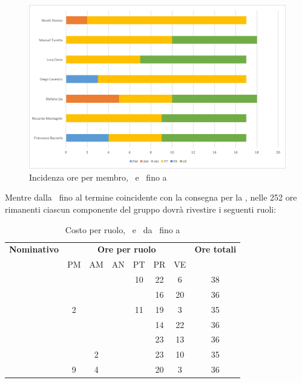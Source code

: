 \begin{figure}[H]
	\centering 
	\includegraphics[scale=0.7]{Immagini/GraficiPianoLavoro/PD.png}
	\caption{Incidenza ore per membro, \PD\ e \COD\ fino a \RP}
\end{figure}

\newpage
Mentre dalla \RP\ fino al termine coincidente con la consegna per la \RQ, nelle 252 ore rimanenti ciascun componente del gruppo dovrà rivestire i seguenti ruoli:

\begin{table}[h]
	\begin{center}
		\begin{tabular}{|c|c|c|c|c|c|c|c|}
			\hline
			\textbf{Nominativo} & \multicolumn{6}{c|}{\textbf{Ore per ruolo}} & \textbf{Ore totali} \\
					& PM & AM & AN & PT & PR & VE & \\
			\hline
			\FB		&	 &	  &	   & 10	& 22 &	6  &	38	\\
			\hline
			\RM		&	 &	  &	   & 	& 16 & 20 & 36	\\
			\hline
			\SL		& 2  &	  &	   & 11	& 19 & 3  &	35	\\
			\hline
			\DC		&	 &	  &	   &	& 14	 & 22 &	36	\\
			\hline
			\LD 	&	 &	  &	   &	& 23 & 13 &	36	\\
			\hline
			\MT		& 	 & 2  &	   &	& 23 & 10  &	35	\\
			\hline
			\ND 	& 9	 & 4  &	   &	& 20 & 3   & 36	\\
			\hline
		\end{tabular}
	\end{center}
	\caption{Costo per ruolo, \PD\ e \COD\ da \RP\ fino a \RQ}
\end{table}

